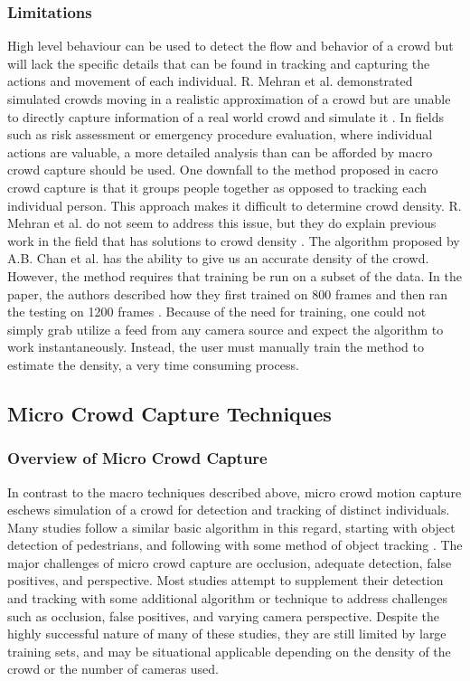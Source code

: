 \documentclass[12pt, onecolumn, conference]{IEEEtran}
\begin{document}
\subsubsection{Limitations}

High level behaviour can be used to detect the flow and behavior of a crowd but will lack the specific details that can be found in tracking and capturing the actions and movement of each individual. R. Mehran et al. demonstrated simulated crowds moving in a realistic approximation of a crowd but are unable to directly capture information of a real world crowd and simulate it \cite{R. Mehran}. 
In fields such as risk assessment or emergency procedure evaluation, where individual actions are valuable, a more detailed analysis than can be afforded by macro crowd capture should be used.
One downfall to the method proposed in cacro crowd capture is that it groups people together as opposed to tracking each individual person. This approach makes it difficult to determine crowd density. R. Mehran et al. do not seem to address this issue, but they do explain previous work in the field that has solutions to crowd density \cite{N. Courty}\cite{R. Mehran}\cite{S. Saxena}. 
The algorithm proposed by A.B. Chan et al. has the ability to give us an accurate density of the crowd. However, the method requires that training be run on a subset of the data. In the paper, the authors described how they first trained on 800 frames and then ran the testing on 1200 frames \cite{A.B. Chan}. Because of the need for training, one could not simply grab utilize a feed from any camera source and expect the algorithm to work instantaneously. Instead, the user must manually train the method to estimate the density, a very time consuming process.

\subsection{Micro Crowd Capture Techniques}

\subsubsection{Overview of Micro Crowd Capture}

In contrast to the macro techniques described above, micro crowd motion capture eschews simulation of a crowd for detection and tracking of distinct individuals. Many studies follow a similar basic algorithm in this regard, starting with object detection of pedestrians, and following with some method of object tracking \cite{M. Rodriguez}\cite{D. Zhang}\cite{I. Ali}\cite{F. Zhao}\cite{I. Ali2}. The major challenges of micro crowd capture are occlusion, adequate detection, false positives, and perspective. Most studies attempt to supplement their detection and tracking with some additional algorithm or technique to address challenges such as occlusion, false positives, and varying camera perspective. 
Despite the highly successful nature of many of these studies, they are still limited by large training sets, and may be situational applicable depending on the density of the crowd or the number of cameras used.
\end{document}
